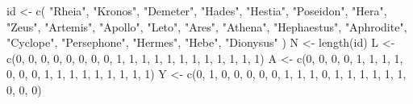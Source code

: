 \documentclass[
  10pt,
  a4paper,
]{book}
\newenvironment{Shaded}{\begin{snugshade}}{\end{snugshade}}
\newcommand{\DecValTok}[1]{\textcolor[rgb]{0.68,0.00,0.00}{#1}}
\newcommand{\FunctionTok}[1]{\textcolor[rgb]{0.28,0.35,0.67}{#1}}
\newcommand{\NormalTok}[1]{\textcolor[rgb]{0.00,0.46,0.62}{#1}}
\newcommand{\OtherTok}[1]{\textcolor[rgb]{0.00,0.46,0.62}{#1}}
\newcommand{\StringTok}[1]{\textcolor[rgb]{0.13,0.47,0.30}{#1}}
\begin{document}
\begin{Shaded}
\begin{Highlighting}[]
\NormalTok{id }\OtherTok{\textless{}{-}} \FunctionTok{c}\NormalTok{(}
  \StringTok{"Rheia"}\NormalTok{,}
  \StringTok{"Kronos"}\NormalTok{,}
  \StringTok{"Demeter"}\NormalTok{,}
  \StringTok{"Hades"}\NormalTok{,}
  \StringTok{"Hestia"}\NormalTok{,}
  \StringTok{"Poseidon"}\NormalTok{,}
  \StringTok{"Hera"}\NormalTok{,}
  \StringTok{"Zeus"}\NormalTok{,}
  \StringTok{"Artemis"}\NormalTok{,}
  \StringTok{"Apollo"}\NormalTok{,}
  \StringTok{"Leto"}\NormalTok{,}
  \StringTok{"Ares"}\NormalTok{,}
  \StringTok{"Athena"}\NormalTok{,}
  \StringTok{"Hephaestus"}\NormalTok{,}
  \StringTok{"Aphrodite"}\NormalTok{,}
  \StringTok{"Cyclope"}\NormalTok{,}
  \StringTok{"Persephone"}\NormalTok{,}
  \StringTok{"Hermes"}\NormalTok{,}
  \StringTok{"Hebe"}\NormalTok{,}
  \StringTok{"Dionysus"}
\NormalTok{)}
\NormalTok{N }\OtherTok{\textless{}{-}} \FunctionTok{length}\NormalTok{(id)}
\NormalTok{L }\OtherTok{\textless{}{-}} \FunctionTok{c}\NormalTok{(}\DecValTok{0}\NormalTok{, }\DecValTok{0}\NormalTok{, }\DecValTok{0}\NormalTok{, }\DecValTok{0}\NormalTok{, }\DecValTok{0}\NormalTok{, }\DecValTok{0}\NormalTok{, }\DecValTok{0}\NormalTok{, }\DecValTok{0}\NormalTok{, }\DecValTok{1}\NormalTok{, }\DecValTok{1}\NormalTok{, }\DecValTok{1}\NormalTok{, }\DecValTok{1}\NormalTok{, }\DecValTok{1}\NormalTok{, }\DecValTok{1}\NormalTok{, }\DecValTok{1}\NormalTok{, }\DecValTok{1}\NormalTok{, }\DecValTok{1}\NormalTok{, }\DecValTok{1}\NormalTok{, }\DecValTok{1}\NormalTok{, }\DecValTok{1}\NormalTok{)}
\NormalTok{A }\OtherTok{\textless{}{-}} \FunctionTok{c}\NormalTok{(}\DecValTok{0}\NormalTok{, }\DecValTok{0}\NormalTok{, }\DecValTok{0}\NormalTok{, }\DecValTok{0}\NormalTok{, }\DecValTok{1}\NormalTok{, }\DecValTok{1}\NormalTok{, }\DecValTok{1}\NormalTok{, }\DecValTok{1}\NormalTok{, }\DecValTok{0}\NormalTok{, }\DecValTok{0}\NormalTok{, }\DecValTok{0}\NormalTok{, }\DecValTok{1}\NormalTok{, }\DecValTok{1}\NormalTok{, }\DecValTok{1}\NormalTok{, }\DecValTok{1}\NormalTok{, }\DecValTok{1}\NormalTok{, }\DecValTok{1}\NormalTok{, }\DecValTok{1}\NormalTok{, }\DecValTok{1}\NormalTok{, }\DecValTok{1}\NormalTok{)}
\NormalTok{Y }\OtherTok{\textless{}{-}} \FunctionTok{c}\NormalTok{(}\DecValTok{0}\NormalTok{, }\DecValTok{1}\NormalTok{, }\DecValTok{0}\NormalTok{, }\DecValTok{0}\NormalTok{, }\DecValTok{0}\NormalTok{, }\DecValTok{0}\NormalTok{, }\DecValTok{0}\NormalTok{, }\DecValTok{1}\NormalTok{, }\DecValTok{1}\NormalTok{, }\DecValTok{1}\NormalTok{, }\DecValTok{0}\NormalTok{, }\DecValTok{1}\NormalTok{, }\DecValTok{1}\NormalTok{, }\DecValTok{1}\NormalTok{, }\DecValTok{1}\NormalTok{, }\DecValTok{1}\NormalTok{, }\DecValTok{1}\NormalTok{, }\DecValTok{0}\NormalTok{, }\DecValTok{0}\NormalTok{, }\DecValTok{0}\NormalTok{)}

\end{Highlighting}
\end{Shaded}
\end{document}
